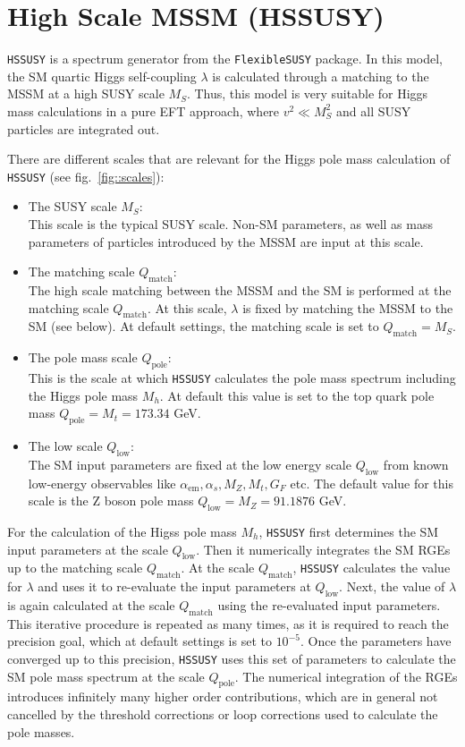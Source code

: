 \documentclass[a4paper,12pt]{book}
\begin{document}
\section{High Scale MSSM (HSSUSY)}
\label{sec::HS}
\texttt{HSSUSY} is a spectrum generator from the \texttt{FlexibleSUSY} package. In this model, the SM quartic Higgs self-coupling $\lambda$ is calculated through a matching to the MSSM at a high SUSY scale $M_S$. Thus, this model is very suitable for Higgs mass calculations in a pure EFT approach, where $v^2 \ll M_S^2$ and all SUSY particles are integrated out.\par
There are different scales that are relevant for the Higgs pole mass calculation of \texttt{HSSUSY} (see fig.\ \ref{fig::scales}):
\begin{itemize}
\item{The SUSY scale $M_S$:}\\
This scale is the typical SUSY scale. Non-SM parameters, as well as mass parameters of particles introduced by the MSSM are input at this scale. 
\item{The matching scale $Q_\text{match}$:}\\
The high scale matching between the MSSM and the SM is performed at the matching scale $Q_\text{match}$. At this scale, $\lambda$ is fixed by matching the MSSM to the SM (see below). At default settings, the matching scale is set to $Q_\text{match} = M_S$.
\item{The pole mass scale $Q_\text{pole}$:}\\
This is the scale at which \texttt{HSSUSY} calculates the pole mass spectrum including the Higgs pole mass $M_h$. At default this value is set to the top quark pole mass $Q_\text{pole}=M_t = 173.34$ GeV.
\item{The low scale $Q_\text{low}$:}\\
The SM input parameters are fixed at the low energy scale $Q_\text{low}$ from known low-energy observables like $\alpha_\text{em},\alpha_s,M_Z,M_t,G_F$ etc. The default value for this scale is the Z boson pole mass $Q_\text{low}=M_Z = 91.1876$ GeV.  
\end{itemize}
For the calculation of the Higss pole mass $M_h$, \texttt{HSSUSY} first determines the SM input parameters at the scale $Q_\text{low}$. Then it numerically integrates the SM RGEs up to the matching scale $Q_\text{match}$. At the scale $Q_\text{match}$, \texttt{HSSUSY} calculates the value for $\lambda$ and uses it to re-evaluate the input parameters at $Q_\text{low}$. Next, the value of $\lambda$ is again calculated at the scale $Q_\text{match}$ using the re-evaluated input parameters. This iterative procedure is repeated as many times, as it is required to reach the precision goal, which at default settings is set to $10^{-5}$. Once the parameters have converged up to this precision, \texttt{HSSUSY} uses this set of parameters to calculate the SM pole mass spectrum at the scale $Q_\text{pole}$. The numerical integration of the RGEs introduces infinitely many higher order contributions, which are in general not cancelled by the threshold corrections or loop corrections used to calculate the pole masses.\\
\end{document}
